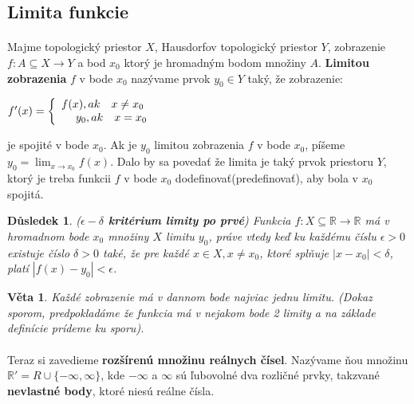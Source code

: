 \documentclass[12pt,a4paper]{article}
\newtheorem{sentence}{Věta}
\newtheorem{result}{Důsledek}
\begin{document}
\subsection{Limita funkcie}
\paragraph{}
Majme topologický priestor $X$, Hausdorfov topologický priestor $Y$, zobrazenie $f:A \subseteq X \rightarrow Y$ a bod $x_{0}$ ktorý je hromadným bodom množiny $A$. \textbf{Limitou zobrazenia} $f$ v bode $x_{0}$ nazývame prvok $y_{0} \in Y$ taký, že zobrazenie: 
\begin{center}
	$f'(x) = \left\{ \begin{array}{ll} f(x), ak\hspace{0.35cm} x \neq x_{0} \\ \hspace{0.45cm} y_{0}, ak \hspace{0.35cm}x = x_{0} \\ \end{array} \right.$
\end{center}
je spojité v bode $x_{0}$. Ak je $y_{0}$ limitou zobrazenia $f$ v bode $x_{0}$, píšeme $y_{0}=\lim_{x \to x_{0}} f(x)$. Dalo by sa povedať že limita je taký prvok priestoru $Y$, ktorý je treba funkcii $f$ v bode $x_{0}$ dodefinovať(predefinovať), aby bola v $x_{0}$ spojitá.

\begin{result}
	(\textbf{$\epsilon -\delta$ kritérium limity po prvé}) Funkcia $f: X \subseteq \mathds{R} \rightarrow \mathds{R}$ má v hromadnom bode $x_{0}$ množiny $X$ limitu $y_{0}$, práve vtedy keď ku každému číslu $\epsilon>0$ existuje číslo $\delta>0$ také, že pre každé $x \in X, x\neq x_{0}$, ktoré splňuje $|x-x_{0}|<\delta$, platí $|f(x)-y_{0}|<\epsilon$.
\end{result}

\begin{sentence}
	Každé zobrazenie má v dannom bode najviac jednu limitu. (Dokaz sporom, predpokladáme že funkcia má v nejakom bode 2 limity a na základe definície prídeme ku sporu).
\end{sentence}
\vspace{-0.8cm}
\paragraph{}
Teraz si zavedieme \textbf{rozšírenú množinu reálnych čísel}. Nazývame ňou množinu \\ $\mathds{R}' = R \cup \{-\infty, \infty\}$, kde $-\infty $ a $ \infty$ sú ľubovolné dva rozličné prvky, takzvané \textbf{nevlastné body}, ktoré niesú reálne čísla.
\vspace{-0.5cm}
\end{document}
